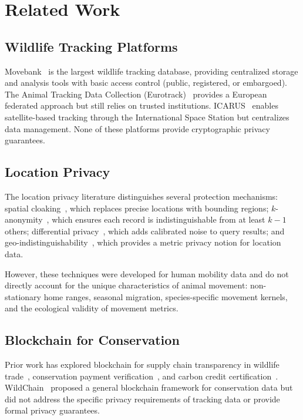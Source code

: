 \section{Related Work}


\subsection{Wildlife Tracking Platforms}

Movebank~\cite{movebank2024} is the largest wildlife tracking database, providing centralized storage and analysis tools with basic access control (public, registered, or embargoed). The Animal Tracking Data Collection (Eurotrack)~\cite{eurotrack2020} provides a European federated approach but still relies on trusted institutions. ICARUS~\cite{wikelski2007} enables satellite-based tracking through the International Space Station but centralizes data management. None of these platforms provide cryptographic privacy guarantees.

\subsection{Location Privacy}

The location privacy literature distinguishes several protection mechanisms: spatial cloaking~\cite{gruteser2003}, which replaces precise locations with bounding regions; $k$-anonymity~\cite{sweeney2002}, which ensures each record is indistinguishable from at least $k-1$ others; differential privacy~\cite{dwork2006}, which adds calibrated noise to query results; and geo-indistinguishability~\cite{andres2013}, which provides a metric privacy notion for location data.

However, these techniques were developed for human mobility data and do not directly account for the unique characteristics of animal movement: non-stationary home ranges, seasonal migration, species-specific movement kernels, and the ecological validity of movement metrics.

\subsection{Blockchain for Conservation}

Prior work has explored blockchain for supply chain transparency in wildlife trade~\cite{maxwell2021}, conservation payment verification~\cite{kshetri2021}, and carbon credit certification~\cite{howson2019}. WildChain~\cite{wildchain2023} proposed a general blockchain framework for conservation data but did not address the specific privacy requirements of tracking data or provide formal privacy guarantees.

